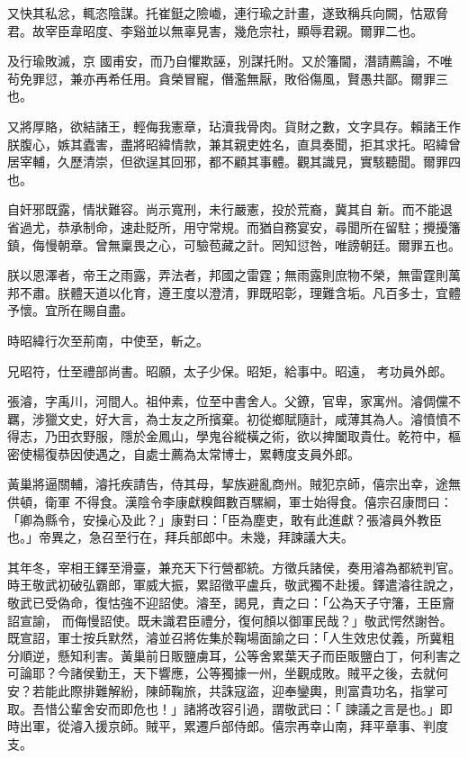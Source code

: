 \begin{pinyinscope}
 又快其私忿，輒恣陰謀。托崔鋌之險巇，連行瑜之計畫，遂致稱兵向闕，怙眾脅君。故宰臣韋昭度、李谿並以無辜見害，幾危宗社，顯辱君親。爾罪二也。



 及行瑜敗滅，京
 國甫安，而乃自懼欺誣，別謀托附。又於籓閫，潛請薦論，不唯茍免罪愆，兼亦再希任用。貪榮冒寵，僭濫無厭，敗俗傷風，賢愚共鄙。爾罪三也。



 又將厚賂，欲結諸王，輕侮我憲章，玷瀆我骨肉。貨財之數，文字具存。賴諸王作朕腹心，嫉其蠹害，盡將昭緯情款，兼其親吏姓名，直具奏聞，拒其求托。昭緯曾居宰輔，久歷清崇，但欲逞其回邪，都不顧其事體。觀其識見，實駭聽聞。爾罪四也。



 自奸邪既露，情狀難容。尚示寬刑，未行嚴憲，投於荒裔，冀其自
 新。而不能退省過尤，恭承制命，速赴貶所，用守常規。而猶自務宴安，尋聞所在留駐；攪擾籓鎮，侮慢朝章。曾無稟畏之心，可驗苞藏之計。罔知愆咎，唯謗朝廷。爾罪五也。



 朕以恩澤者，帝王之雨露，弄法者，邦國之雷霆；無雨露則庶物不榮，無雷霆則萬邦不肅。朕體天道以化育，遵王度以澄清，罪既昭彰，理難含垢。凡百多士，宜體予懷。宜所在賜自盡。



 時昭緯行次至荊南，中使至，斬之。



 兄昭符，仕至禮部尚書。昭願，太子少保。昭矩，給事中。昭遠，
 考功員外郎。



 張濬，字禹川，河間人。祖仲素，位至中書舍人。父鐐，官卑，家寓州。濬倜儻不羈，涉獵文史，好大言，為士友之所擯棄。初從鄉賦隨計，咸薄其為人。濬憤憤不得志，乃田衣野服，隱於金鳳山，學鬼谷縱橫之術，欲以捭闔取貴仕。乾符中，樞密使楊復恭因使遇之，自處士薦為太常博士，累轉度支員外郎。



 黃巢將逼關輔，濬托疾請告，侍其母，挈族避亂商州。賊犯京師，僖宗出幸，途無供頓，衛軍
 不得食。漢陰令李康獻糗餌數百騾綱，軍士始得食。僖宗召康問曰：「卿為縣令，安操心及此？」康對曰：「臣為塵吏，敢有此進獻？張濬員外教臣也。」帝異之，急召至行在，拜兵部郎中。未幾，拜諫議大夫。



 其年冬，宰相王鐸至滑臺，兼充天下行營都統。方徵兵諸侯，奏用濬為都統判官。時王敬武初破弘霸郎，軍威大振，累詔徵平盧兵，敬武獨不赴援。鐸遣濬往說之，敬武已受偽命，復怙強不迎詔使。濬至，謁見，責之曰：「公為天子守籓，王臣齎詔宣諭，
 而侮慢詔使。既未識君臣禮分，復何顏以御軍民哉？」敬武愕然謝咎。既宣詔，軍士按兵默然，濬並召將佐集於鞠場面諭之曰：「人生效忠仗義，所冀粗分順逆，懸知利害。黃巢前日販鹽虜耳，公等舍累葉天子而臣販鹽白丁，何利害之可論耶？今諸侯勤王，天下響應，公等獨據一州，坐觀成敗。賊平之後，去就何安？若能此際排難解紛，陳師鞠旅，共誅寇盜，迎奉鑾輿，則富貴功名，指掌可取。吾惜公輩舍安而即危也！」諸將改容引過，謂敬武曰：「
 諫議之言是也。」即時出軍，從濬入援京師。賊平，累遷戶部侍郎。僖宗再幸山南，拜平章事、判度支。




\end{pinyinscope}
